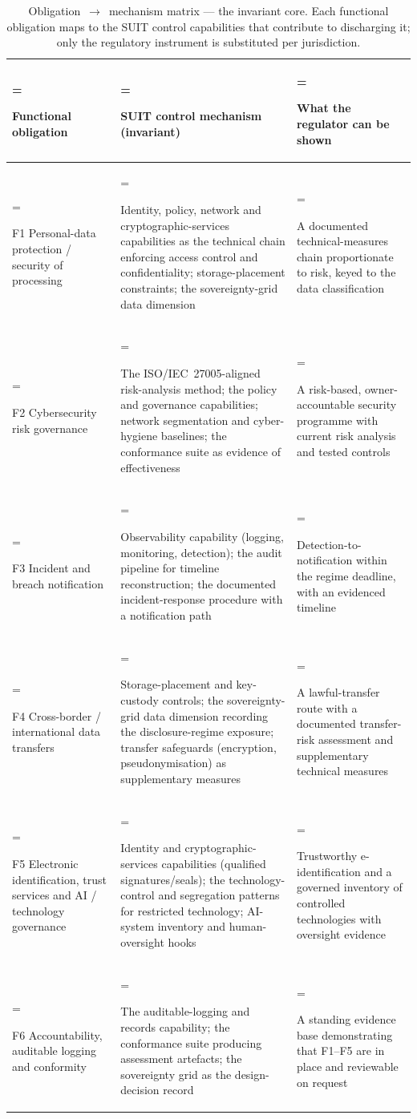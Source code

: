 \begin{table}[H]
\centering\small
\caption{Obligation~$\rightarrow$~mechanism matrix --- the
invariant core. Each functional obligation maps to the SUIT control
capabilities that contribute to discharging it; only the regulatory
instrument is substituted per jurisdiction.}
\label{tab:reg-matrix}
\renewcommand{\arraystretch}{1.25}
\begin{tabularx}{\textwidth}{%
  >{\hsize=0.42\hsize\linewidth=\hsize\bfseries\raggedright\arraybackslash}X%
  >{\hsize=1.28\hsize\linewidth=\hsize\raggedright\arraybackslash}X%
  >{\hsize=1.30\hsize\linewidth=\hsize\raggedright\arraybackslash}X%
}
\toprule
Functional obligation & SUIT control mechanism (invariant) &
What the regulator can be shown \\
\midrule
F1 Personal-data protection / security of processing
  & Identity, policy, network and cryptographic-services capabilities
    as the technical chain enforcing access control and confidentiality;
    storage-placement constraints; the sovereignty-grid data dimension
  & A documented technical-measures chain proportionate to risk,
    keyed to the data classification \\
F2 Cybersecurity risk governance
  & The ISO/IEC~27005-aligned risk-analysis method; the policy and
    governance capabilities; network segmentation and cyber-hygiene
    baselines; the conformance suite as evidence of effectiveness
  & A risk-based, owner-accountable security programme with current
    risk analysis and tested controls \\
F3 Incident and breach notification
  & Observability capability (logging, monitoring, detection); the
    audit pipeline for timeline reconstruction; the documented
    incident-response procedure with a notification path
  & Detection-to-notification within the regime deadline, with an
    evidenced timeline \\
F4 Cross-border / international data transfers
  & Storage-placement and key-custody controls; the sovereignty-grid
    data dimension recording the disclosure-regime exposure; transfer
    safeguards (encryption, pseudonymisation) as supplementary measures
  & A lawful-transfer route with a documented transfer-risk assessment
    and supplementary technical measures \\
F5 Electronic identification, trust services and
    AI / technology governance
  & Identity and cryptographic-services capabilities (qualified
    signatures/seals); the technology-control and segregation patterns
    for restricted technology; AI-system inventory and human-oversight
    hooks
  & Trustworthy e-identification and a governed inventory of
    controlled technologies with oversight evidence \\
F6 Accountability, auditable logging and conformity
  & The auditable-logging and records capability; the conformance
    suite producing assessment artefacts; the sovereignty grid as the
    design-decision record
  & A standing evidence base demonstrating that F1--F5 are in place
    and reviewable on request \\
\bottomrule
\end{tabularx}
\end{table}

